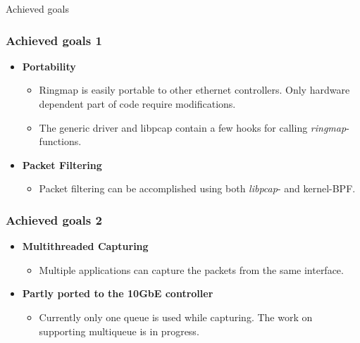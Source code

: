 \begin{frame}
	\begin{center}
	\huge{Achieved goals}
	\end{center}
\end{frame}


\begin{frame}
\frametitle{Achieved goals 1}
\begin{itemize}
	\item \textbf{Portability}
		\begin{itemize}
			\item Ringmap is easily portable to other ethernet controllers.
				Only hardware dependent part of code require modifications.
			\item The generic driver and libpcap contain a few hooks for calling
				\emph{ringmap}-functions.\newline
		\end{itemize}
	\item \textbf{Packet Filtering}
		\begin{itemize}
			\item Packet filtering can be accomplished using both
				\emph{libpcap}- and kernel-BPF.
		\end{itemize}
\end{itemize}
\end{frame}


\begin{frame}
\frametitle{Achieved goals 2}
\begin{itemize}
	\item \textbf{Multithreaded Capturing}
		\begin{itemize}
			\item Multiple applications can capture the packets from the same
				interface.\newline
		\end{itemize}
	\item \textbf{Partly ported to the 10GbE controller}
		\begin{itemize}
			\item Currently only one queue is used while capturing. The work on
				supporting multiqueue is in progress.
		\end{itemize}
\end{itemize}
\end{frame}


